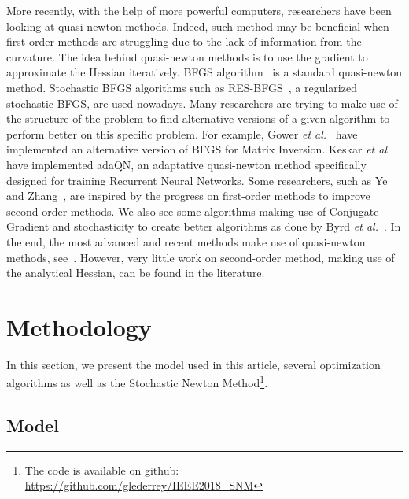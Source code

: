 \documentclass[conference]{IEEEtran}
\begin{document}
More recently, with the help of more powerful computers, researchers have been looking at quasi-newton methods. Indeed, such method may be beneficial when first-order methods are struggling due to the lack of information from the curvature. The idea behind quasi-newton methods is to use the gradient to approximate the Hessian iteratively. BFGS algorithm~\cite{fletcher_practical_1987} is a standard quasi-newton method. Stochastic BFGS algorithms such as RES-BFGS~\cite{mokhtari_res:_2014}, a regularized stochastic BFGS, are used nowadays. Many researchers are trying to make use of the structure of the problem to find alternative versions of a given algorithm to perform better on this specific problem. For example, Gower {\it et al.}~\cite{gower_accelerated_2018} have implemented an alternative version of BFGS for Matrix Inversion. Keskar {\it et al.}~\cite{keskar_adaqn:_2016} have implemented adaQN, an adaptative quasi-newton method specifically designed for training Recurrent Neural Networks. Some researchers, such as Ye and Zhang~\cite{ye_nestrovs_2017}, are inspired by the progress on first-order methods to improve second-order methods. We also see some algorithms making use of Conjugate Gradient and stochasticity to create better algorithms as done by Byrd {\it et al.}~\cite{byrd_use_2011}. In the end, the most advanced and recent methods make use of quasi-newton methods, see~\cite{kiros_training_2013,bordes_sgd-qn:_2009,bordes_erratum:_2010,agarwal_second-order_2016}. However, very little work on second-order method, making use of the analytical Hessian, can be found in the literature.

\vspace{-0.2cm}
\section{Methodology}
\label{sec:methodo}

In this section, we present the model used in this article, several optimization algorithms as well as the Stochastic Newton Method\footnote{The code is available on github: \href{https://github.com/glederrey/IEEE2018\_SNM}{https://github.com/glederrey/IEEE2018\_SNM}}.

\subsection{Model}
\label{sec:model}
\end{document}

